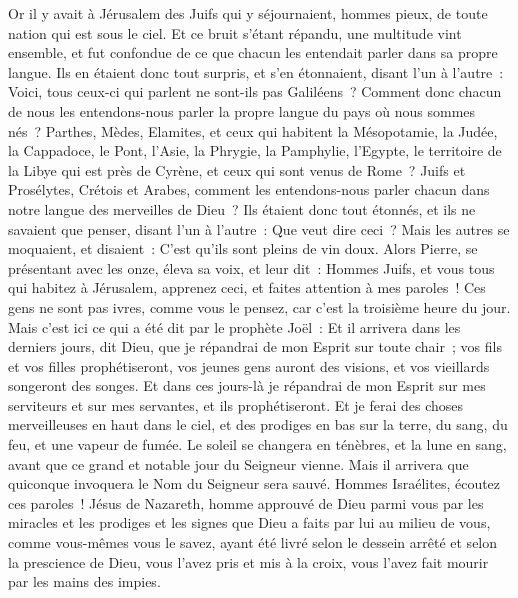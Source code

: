 \begin{multicols}{2}
Or il y avait à Jérusalem des Juifs qui y séjournaient, hommes pieux, de toute nation qui est sous le ciel.
Et ce bruit s'étant répandu, une multitude vint ensemble, et fut confondue de ce que chacun les entendait parler dans sa propre langue. 
Ils en étaient donc tout surpris, et s'en étonnaient, disant l'un à l'autre~: Voici, tous ceux-ci qui parlent ne sont-ils pas Galiléens~?
Comment donc chacun de nous les entendons-nous parler la propre langue du pays où nous sommes nés~? 
Parthes, Mèdes, Elamites, et ceux qui habitent la Mésopotamie, la Judée, la Cappadoce, le Pont, l'Asie,
la Phrygie, la Pamphylie, l'Egypte, le territoire de la Libye qui est près de Cyrène, et ceux qui sont venus de Rome~? Juifs et Prosélytes,
 Crétois et Arabes, comment les entendons-nous parler chacun dans notre langue des merveilles de Dieu~?
Ils étaient donc tout étonnés, et ils ne savaient que penser, disant l'un à l'autre~: Que veut dire ceci~?
Mais les autres se moquaient, et disaient~: C'est qu'ils sont pleins de vin doux.
Alors Pierre, se présentant avec les onze, éleva sa voix, et leur dit~: Hommes Juifs, et vous tous qui habitez à Jérusalem, apprenez ceci, et faites attention à mes paroles~!
Ces gens ne sont pas ivres, comme vous le pensez, car c'est la troisième heure du jour.
Mais c'est ici ce qui a été dit par le prophète Joël~:
Et il arrivera dans les derniers jours, dit Dieu, que je répandrai de mon Esprit sur toute chair~; vos fils et vos filles prophétiseront, vos jeunes gens auront des visions, et vos vieillards songeront des songes.
Et dans ces jours-là je répandrai de mon Esprit sur mes serviteurs et sur mes servantes, et ils prophétiseront.
Et je ferai des choses merveilleuses en haut dans le ciel, et des prodiges en bas sur la terre, du sang, du feu, et une vapeur de fumée.
Le soleil se changera en ténèbres, et la lune en sang, avant que ce grand et notable jour du Seigneur vienne.
Mais il arrivera que quiconque invoquera le Nom du Seigneur sera sauvé.
Hommes Israélites, écoutez ces paroles~! Jésus de Nazareth, homme approuvé de Dieu parmi vous par les miracles et les prodiges et les signes que Dieu a faits par lui au milieu de vous, comme vous-mêmes vous le savez,
ayant été livré selon le dessein arrêté et selon la prescience de Dieu, vous l'avez pris et mis à la croix, vous l'avez fait mourir par les mains des impies.

\end{multicols}
